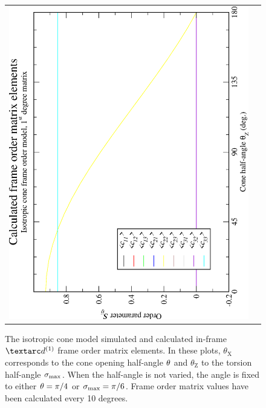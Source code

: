\begin{figure}
\begin{tabular}{@{}cc@{}}
    \includegraphics[width=.35\textwidth,angle=270]{images/frame_order_matrix/Sij_iso_cone_in_frame_theta_z_calc.eps} \\
  \end{tabular}
  \caption[Isotropic cone simulated and calculated in-frame $\FOone$ elements.]{
    The isotropic cone model simulated and calculated in-frame $\FOone$ frame order matrix elements.
    In these plots, $\theta_\textrm{X}$ corresponds to the cone opening half-angle $\theta$ and $\theta_\textrm{Z}$ to the torsion half-angle $\sigma_\textrm{max}$.
    When the half-angle is not varied, the angle is fixed to either $\theta = \pi/4$ or $\sigma_\textrm{max} = \pi/6$.
    Frame order matrix values have been calculated every 10 degrees.
  }
  \label{fig: simulated and calculated in-frame 1st degree iso cone frame order}
\end{figure}

